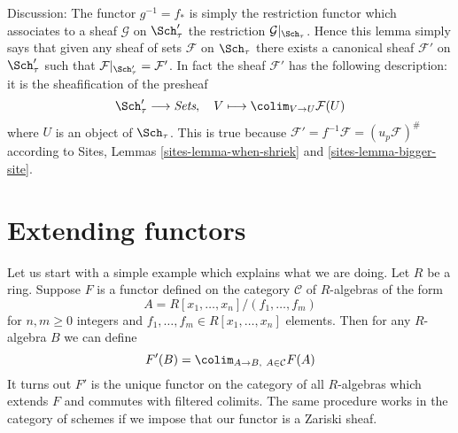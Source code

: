 \noindent
Discussion:
The functor $g^{-1} = f_*$ is simply the restriction functor which associates
to a sheaf $\mathcal{G}$ on $\Sch'_\tau$ the restriction
$\mathcal{G}|_{\Sch_\tau}$. Hence this lemma simply says that given
any sheaf of sets $\mathcal{F}$ on $\Sch_\tau$ there exists a
canonical sheaf $\mathcal{F}'$ on $\Sch'_\tau$ such that
$\mathcal{F}|_{\Sch'_\tau} = \mathcal{F}'$. In fact the sheaf
$\mathcal{F}'$ has the following description: it is the sheafification
of the presheaf
$$
\Sch'_\tau \longrightarrow \textit{Sets}, \quad
V \longmapsto \colim_{V \to U} \mathcal{F}(U)
$$
where $U$ is an object of $\Sch_\tau$. This is true because
$\mathcal{F}' = f^{-1}\mathcal{F} = (u_p\mathcal{F})^\#$ according to
Sites, Lemmas \ref{sites-lemma-when-shriek} and \ref{sites-lemma-bigger-site}.






\section{Extending functors}
\label{section-extending-functors}

\noindent
Let us start with a simple example which explains what we are doing.
Let $R$ be a ring. Suppose $F$ is a functor defined on the category
$\mathcal{C}$ of $R$-algebras of the form
$$
A = R[x_1, \ldots, x_n]/(f_1, \ldots, f_m)
$$
for $n, m \geq 0$ integers and $f_1, \ldots, f_m \in R[x_1, \ldots, x_n]$
elements. Then for any $R$-algebra $B$ we can define
$$
F'(B) = \colim_{A \to B,\ A \in \mathcal{C}} F(A)
$$
It turns out $F'$ is the unique functor on the category
of all $R$-algebras which extends $F$ and commutes with filtered
colimits. The same procedure works in the category of schemes
if we impose that our functor is a Zariski sheaf.

